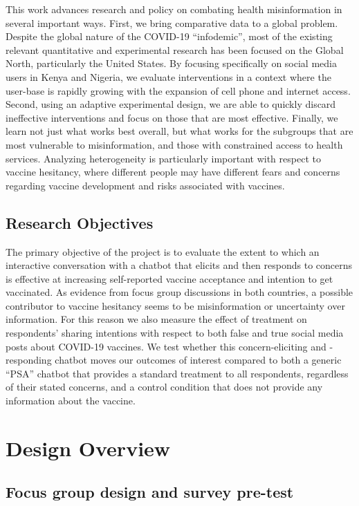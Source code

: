 \documentclass[letterpaper, 12pt, parskip=full,DIV=10]{scrartcl}
\begin{document}
This work advances research and policy on combating health misinformation in several important ways. First, we bring comparative data to a global problem. Despite the global nature of the COVID-19 “infodemic”, most of the existing relevant quantitative and experimental research has been focused on the Global North, particularly the United States. By focusing specifically on social media users in Kenya and Nigeria, we evaluate interventions in a context where the user-base is rapidly growing with the expansion of cell phone and internet access. Second, using an adaptive experimental design, we are able to quickly discard ineffective interventions and focus on those that are most effective. Finally, we learn not just what works best overall, but what works for the subgroups that are most vulnerable to misinformation, and those with constrained access to health services. Analyzing heterogeneity is particularly important with respect to vaccine hesitancy, where different people may have different fears and concerns regarding vaccine development and risks associated with vaccines. 

\subsection{Research Objectives} 

The primary objective of the project is to evaluate the extent to which an interactive conversation with a chatbot that elicits and then responds to concerns is effective at increasing self-reported vaccine acceptance and intention to get vaccinated. As evidence from focus group discussions in both countries, a possible contributor to vaccine hesitancy seems to be misinformation or uncertainty over information. For this reason we also measure the effect of treatment on respondents’ sharing intentions with respect to both false and true social media posts about COVID-19 vaccines. We test whether this concern-eliciting and -responding chatbot moves our outcomes of interest compared to both a generic “PSA” chatbot that provides a standard treatment to all respondents, regardless of their stated concerns, and a control condition that does not provide any information about the vaccine.


\section{Design Overview}

\subsection{Focus group design and survey pre-test}
\end{document}
